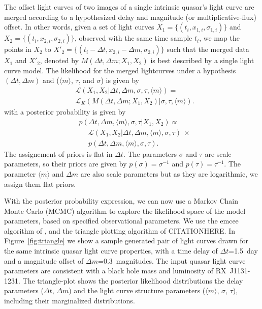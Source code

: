 \documentclass{emulateapj}
\begin{document}
The offset light curves of two images of a single intrinsic quasar's 
light curve are merged according to a hypothesized delay and magnitude
(or multiplicative-flux) offset. In other words, given a set of light curves
$X_1 = \{(t_{i},x_{1,i},\sigma_{1,i})\}$ and $X_2 = \{(t_{i},x_{2,i},\sigma_{2,i})\}$, observed with the same time sample $t_i$,  
we map the points in $X_2$ to $X'_2 = \{(t_{i}-\Delta t,x_{2,i}-\Delta m,\sigma_{2,i})\}$  
such that the merged data $X_1$ and $X'_2$, denoted by $M(\Delta t, \Delta m ; X_1, X_2)$ is best described 
by a single light curve model. The likelihood for the merged lightcurves under a 
hypothesis $(\Delta t, \Delta m)$ and ($\langle m\rangle$, $\tau$, and $\sigma$) is given by
\begin{align}
& \mathcal L (X_1, X_2 | \Delta t, \Delta m, \sigma, \tau, \langle m \rangle)  = \nonumber \\
& \mathcal{L}_{K} \left( M(\Delta
  t,\Delta m ; X_1, X_2) | \sigma, \tau, \langle m \rangle \right). 
\end{align}
with a posterior probability is given by
\begin{align}
& p(\Delta t, \Delta m, \langle m \rangle, \sigma,\tau | X_1, X_2) \propto \nonumber \\
&  \ \ \ \ \ \ \mathcal{L}(X_1, X_2 | \Delta t, \Delta m, \langle m \rangle,
\sigma,\tau)\ \times\nonumber\\
&  \ \ \ \ \ \   p(\Delta t, \Delta m, \langle m \rangle,
\sigma,\tau). 
\end{align}
The assignement of priors is flat in $\Delta t$. The parameters
$\sigma$ and $\tau$ are scale parameters, so their priors are given by
$p(\sigma)=\sigma^{-1}$ and $p(\tau)=\tau^{-1}$. The parameter
$\langle m \rangle$ and $\Delta m$ are also scale parameters but as
they are logarithmic, we assign them flat priors.  

With the posterior probability expression, we can now use a Markov
Chain Monte Carlo (MCMC) algorithm to explore the likelihood space of
the model parameters, based on specified observational parameters. We
use the emcee algorithm of \citet{Foreman-Mackey2013a}, and the
triangle plotting algorithm of CITATIONHERE. In
Figure~\ref{fig:triangle} we show a sample generated pair of light
curves drawn for the same intrinsic quasar light curve properties,
with a time delay of $\Delta t$=1.5~day and a magnitude offset of
$\Delta m$=0.3~magnitudes. The input quasar light curve parameters are 
consistent with a black hole mass and luminosity of RX~J1131-1231.
The triangle-plot shows the posterior likelihood distributions the delay
parameters ($\Delta t$, $\Delta m$) and the light curve structure parameters 
($\langle m\rangle$, $\sigma$, $\tau$), including their
marginalized distributions. 
\end{document}
